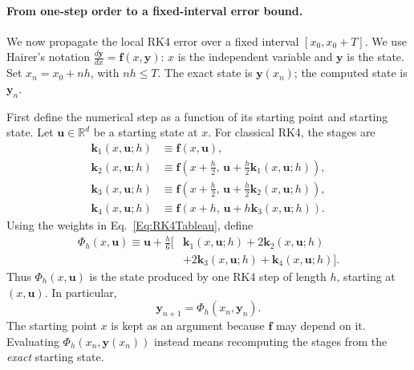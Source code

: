 \paragraph{From one-step order to a fixed-interval error bound.}
We now propagate the local RK4 error over a fixed interval
$[x_0,x_0+T]$. We use Hairer's notation
$\frac{d\mathbf y}{dx}=\mathbf f(x,\mathbf y)$: $x$ is the independent
variable and $\mathbf y$ is the state. Set $x_n=x_0+nh$, with $nh\leq T$.
The exact state is $\mathbf y(x_n)$; the computed state is $\mathbf y_n$.

First define the numerical step as a function of its starting point and
starting state. Let $\mathbf u\in\mathbb R^d$ be a starting state at $x$.
For classical RK4, the stages are
\begin{equation}\label{Eq:RKStepMapStages}
\begin{aligned}
 \mathbf k_1(x,\mathbf u;h)
   &\equiv\mathbf f(x,\mathbf u),\\
 \mathbf k_2(x,\mathbf u;h)
   &\equiv\mathbf f\left(x+\frac h2,\,
                   \mathbf u+\frac h2\mathbf k_1(x,\mathbf u;h)\right),\\
 \mathbf k_3(x,\mathbf u;h)
   &\equiv\mathbf f\left(x+\frac h2,\,
                   \mathbf u+\frac h2\mathbf k_2(x,\mathbf u;h)\right),\\
 \mathbf k_4(x,\mathbf u;h)
   &\equiv\mathbf f\left(x+h,\,
                   \mathbf u+h\mathbf k_3(x,\mathbf u;h)\right).
\end{aligned}
\end{equation}
Using the weights in Eq.~\ref{Eq:RK4Tableau}, define
\begin{equation}\label{Eq:RKStepMapDefinition}
\begin{aligned}
 \Phi_h(x,\mathbf u)\equiv\mathbf u+\frac h6\bigl[
   &\mathbf k_1(x,\mathbf u;h)+2\mathbf k_2(x,\mathbf u;h)\\
   &+2\mathbf k_3(x,\mathbf u;h)+\mathbf k_4(x,\mathbf u;h)\bigr].
\end{aligned}
\end{equation}
Thus $\Phi_h(x,\mathbf u)$ is the state produced by one RK4 step of
length $h$, starting at $(x,\mathbf u)$. In particular,
\begin{equation}\label{Eq:RKStepMapComputedUpdate}
 \mathbf y_{n+1}=\Phi_h(x_n,\mathbf y_n).
\end{equation}
The starting point $x$ is kept as an argument because $\mathbf f$ may
depend on it. Evaluating $\Phi_h(x_n,\mathbf y(x_n))$ instead means
recomputing the stages from the \emph{exact} starting state.

